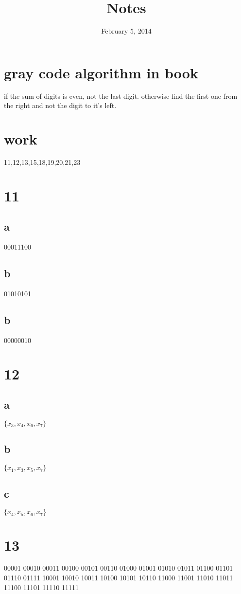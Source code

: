 \documentclass{article}
\begin{document}
\title{Notes}
\date{February 5, 2014}
\maketitle
\section*{gray code algorithm in book}
if the sum of digits is even, not the last digit. otherwise find the first one from the right and not the digit to it's left.

\section*{work}
11,12,13,15,18,19,20,21,23
\section*{11}
\subsection*{a}
00011100
\subsection*{b}
01010101
\subsection*{b}
00000010
\section*{12}
\subsection*{a}
$\{x_3,x_4,x_6,x_7\}$
\subsection*{b}
$\{x_1,x_3,x_5,x_7\}$
\subsection*{c}
$\{x_4,x_5,x_6,x_7\}$
\section*{13}
00001
00010
00011
00100
00101
00110
01000
01001
01010
01011
01100
01101
01110
01111
10001
10010
10011
10100
10101
10110
11000
11001
11010
11011
11100
11101
11110
11111
\end{document}
